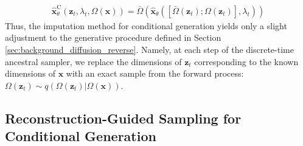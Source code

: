 \documentclass[ oneside,%
                    author={George Herbert},
                    degree={MSci},
                     title={Diffusion Models for Time-Evolving Precipitation Fields},
                  subtitle={}]{dissertation}
\begin{document}
\begin{align}
      \hat{\mathbf{x}}^{\mathrm{C}}_\theta(\mathbf{z}_t, \lambda_t, \Omega(\mathbf{x}))=\bar\Omega\left(\hat{\mathbf{x}}_\theta([\bar\Omega(\mathbf{z}_t); \Omega(\mathbf{z}_t)], \lambda_t )\right)
\end{align}
Thus, the imputation method for conditional generation yields only a slight adjustment to the generative procedure defined in Section \ref{sec:background_diffusion_reverse}. Namely, at each step of the discrete-time ancestral sampler, we replace the dimensions of $\mathbf{z}_t$ corresponding to the known dimensions of $\mathbf{x}$ with an exact sample from the forward process: $\Omega(\mathbf{z}_t)\sim q(\Omega(\mathbf{z}_t)|\Omega(\mathbf{x}))$.

\subsection{Reconstruction-Guided Sampling for Conditional Generation}
\label{sec:background_diffusion_reconstruction_guided_sampling}
\end{document}
